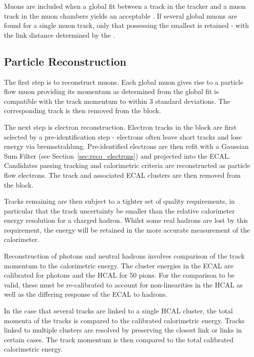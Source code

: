 Muons are included when a global fit between a track in the tracker and a muon
track in the muon chambers yields an acceptable \chisq. If several global muons
are found for a single muon track, only that possessing the smallest \chisq is
retained - with the link distance determined by the \chisq.

\subsection{Particle Reconstruction}
The first step is to reconstruct muons. Each global muon gives rise to a
particle flow muon providing its momentum as determined from the global fit is
compatible with the track momentum to within 3 standard deviations. The
corresponding track is then removed from the block.

The next step is electron reconstruction. Electron tracks in the block are first
selected by a pre-identification step - electrons often leave short tracks and
lose energy via bremsstrahlung. Pre-identified electrons are then refit with a
Gaussian Sum Filter (see Section~\ref{sec:reco_electrons}) and projected into
the \ac{ECAL}.  Candidates passing tracking and calorimetric criteria are
reconstructed as particle flow electrons. The track and associated \ac{ECAL}
clusters are then removed from the block.

Tracks remaining are then subject to a tighter set of quality requirements, in
particular that the track \Pt uncertainty be smaller than the relative
calorimeter energy resolution for a charged hadron. Whilst some real hadrons are
lost by this requirement, the energy will be retained in the more accurate
measurement of the calorimeter.

Reconstruction of photons and neutral hadrons involves comparison of the track
momentum to the calorimetric energy. The cluster energies in the \ac{ECAL} are
calibrated for photons and the \ac{HCAL} for \unit{50}{\GeV} pions. For the
comparison to be valid, these must be re-calibrated to account for
non-linearities in the \ac{HCAL} as well as the differing response of the
\ac{ECAL} to hadrons.

In the case that several tracks are linked to a single \ac{HCAL} cluster, the
total momenta of the tracks is compared to the calibrated calorimetric energy.
Tracks linked to multiple clusters are resolved by preserving the closest link
or links in certain cases. The track momentum is then compared to the total
calibrated calorimetric energy.

